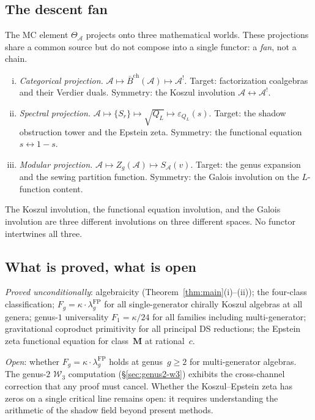 \documentclass[11pt,reqno]{amsart}
\theoremstyle{definition}
\theoremstyle{remark}
\newcommand{\cA}{\mathcal{A}}
\newcommand{\barB}{\bar{B}}
\newcommand{\cW}{\mathcal{W}}
\numberwithin{equation}{section}
\begin{document}
\subsection{The descent fan}

The MC element $\Theta_\cA$ projects onto three mathematical
worlds. These projections share a common source but do not
compose into a single functor: a \emph{fan}, not a chain.

\begin{enumerate}[(i)]
\item \emph{Categorical projection.}
 $\cA \mapsto \barB^{\mathrm{ch}}(\cA) \mapsto \cA^!$.
 Target: factorization coalgebras and their Verdier duals.
 Symmetry: the Koszul involution $\cA \leftrightarrow \cA^!$.

\item \emph{Spectral projection.}
 $\cA \mapsto \{S_r\} \mapsto \sqrt{Q_L} \mapsto
 \varepsilon_{Q_L}(s)$.
 Target: the shadow obstruction tower and the Epstein zeta.
 Symmetry: the functional equation $s \leftrightarrow 1 - s$.

\item \emph{Modular projection.}
 $\cA \mapsto Z_g(\cA) \mapsto S_\cA(v)$.
 Target: the genus expansion and the sewing partition function.
 Symmetry: the Galois involution on the $L$-function content.
\end{enumerate}
The Koszul involution, the functional equation involution, and
the Galois involution are three different involutions on three
different spaces. No functor intertwines all three.

\subsection{What is proved, what is open}

\emph{Proved unconditionally}: algebraicity
(Theorem~\ref{thm:main}(i)--(ii)); the four-class
classification; $F_g = \kappa \cdot \lambda_g^{\mathrm{FP}}$
for all single-generator chirally Koszul algebras at all genera;
genus-$1$ universality $F_1 = \kappa/24$ for all
families including multi-generator; gravitational
coproduct primitivity for all principal DS reductions;
the Epstein zeta functional equation for class~$\mathbf{M}$
at rational~$c$.

\emph{Open}: whether $F_g = \kappa \cdot \lambda_g^{\mathrm{FP}}$
holds at genus~$g \ge 2$ for multi-generator algebras.
The genus-$2$ $\cW_3$ computation (\S\ref{sec:genus2-w3})
exhibits the cross-channel correction that any proof must cancel.
Whether the Koszul--Epstein zeta has zeros on a single critical
line remains open: it requires understanding the arithmetic of
the shadow field beyond present methods.
\end{document}
